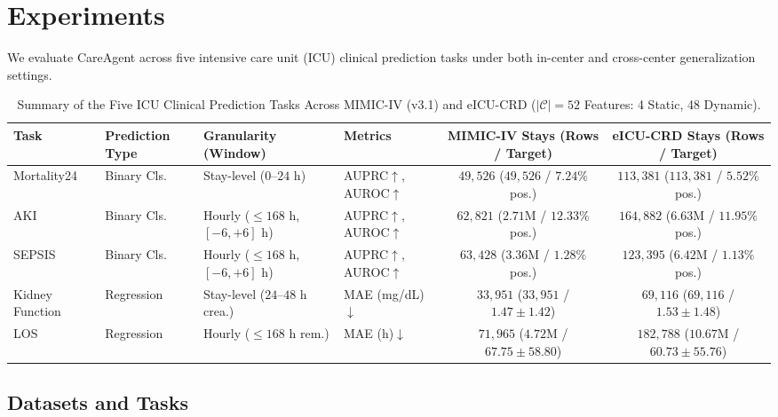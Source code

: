\section{Experiments}
\label{sec:experiments}

We evaluate CareAgent across five intensive care unit (ICU) clinical prediction tasks under both in-center and cross-center generalization settings.

\begin{table}[t]
\centering
\caption{Summary of the Five ICU Clinical Prediction Tasks Across MIMIC-IV (v3.1) and eICU-CRD ($|\mathcal{C}|=52$ Features: 4 Static, 48 Dynamic).}
\label{tab:datasets}
\scriptsize
\setlength{\tabcolsep}{5pt}
\begin{tabular}{llllcc}
\toprule
Task & Prediction Type & Granularity (Window) & Metrics & MIMIC-IV Stays (Rows / Target) & eICU-CRD Stays (Rows / Target) \\
\midrule
Mortality24 & Binary Cls. & Stay-level ($0$--$24\text{ h}$) & AUPRC$\uparrow$, AUROC$\uparrow$ & $49{,}526$ ($49{,}526$ / $7.24\%$ pos.) & $113{,}381$ ($113{,}381$ / $5.52\%$ pos.) \\
AKI & Binary Cls. & Hourly ($\le 168\text{ h}$, $[-6,+6]\text{ h}$) & AUPRC$\uparrow$, AUROC$\uparrow$ & $62{,}821$ ($2.71\text{M}$ / $12.33\%$ pos.) & $164{,}882$ ($6.63\text{M}$ / $11.95\%$ pos.) \\
SEPSIS & Binary Cls. & Hourly ($\le 168\text{ h}$, $[-6,+6]\text{ h}$) & AUPRC$\uparrow$, AUROC$\uparrow$ & $63{,}428$ ($3.36\text{M}$ / $1.28\%$ pos.) & $123{,}395$ ($6.42\text{M}$ / $1.13\%$ pos.) \\
Kidney Function & Regression & Stay-level ($24$--$48\text{ h}$ crea.) & MAE (mg/dL)$\downarrow$ & $33{,}951$ ($33{,}951$ / $1.47{\pm}1.42$) & $69{,}116$ ($69{,}116$ / $1.53{\pm}1.48$) \\
LOS & Regression & Hourly ($\le 168\text{ h}$ rem.) & MAE (h)$\downarrow$ & $71{,}965$ ($4.72\text{M}$ / $67.75{\pm}58.80$) & $182{,}788$ ($10.67\text{M}$ / $60.73{\pm}55.76$) \\
\bottomrule
\end{tabular}
\end{table}

\subsection{Datasets and Tasks}
\label{sec:datasets}

